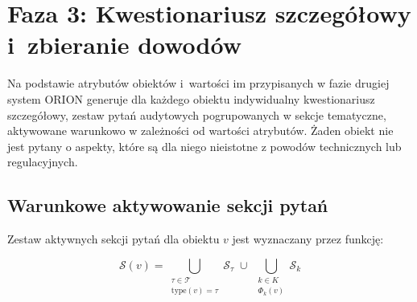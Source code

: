 \section{Faza 3: Kwestionariusz szczegółowy i~zbieranie dowodów}
\label{sec:faza3}

Na podstawie atrybutów obiektów i~wartości im przypisanych w fazie drugiej system ORION generuje dla każdego
obiektu indywidualny kwestionariusz szczegółowy, zestaw pytań audytowych pogrupowanych w sekcje tematyczne,
aktywowane warunkowo w zależności od wartości atrybutów. 
Żaden obiekt nie jest pytany o aspekty, które są dla niego nieistotne z powodów technicznych lub regulacyjnych.



\subsection{Warunkowe aktywowanie sekcji pytań}
\label{sec:aktywowanie-sekcji}

Zestaw aktywnych sekcji pytań dla obiektu $v$ jest wyznaczany przez funkcję:

\begin{equation}
\mathcal{S}(v) =
\bigcup_{\substack{\tau \in \mathcal{T} \\ \mathrm{type}(v)=\tau}} \mathcal{S}_{\tau}
\;\cup\;
\bigcup_{\substack{k \in K \\ \Phi_k(v)}} \mathcal{S}_k
\label{eq:sekcje}
\end{equation}


